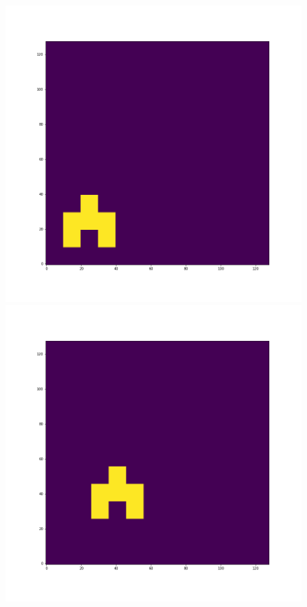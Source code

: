 \documentclass[12pt,a4paper]{article}
\begin{document}
\begin{figure}[H]
\centering
\begin{minipage}{.3\textwidth}
  \centering
  \includegraphics[width=\linewidth]{Pictures/Solve2DWhiteBearMovementTestJR/Solve2DWhiteBearMovementTest_t0.png}
\end{minipage}%
\begin{minipage}{.3\textwidth}
  \centering
  \includegraphics[width=\linewidth]{Pictures/Solve2DWhiteBearMovementTestJR/Solve2DWhiteBearMovementTest_t10.png}

\end{minipage}
\end{figure}
\end{document}
